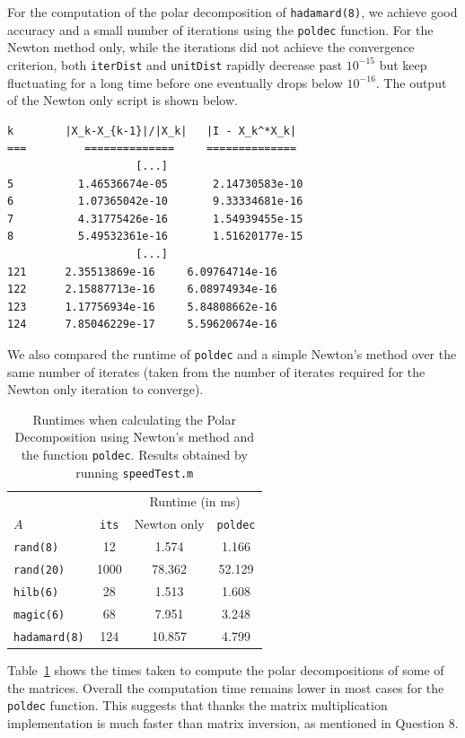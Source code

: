 \documentclass[10pt, A4paper]{article}
\begin{document}
For the computation of the polar decomposition of \texttt{hadamard(8)}, 
we achieve good accuracy and a small number of iterations using the 
\texttt{poldec} function. For the Newton method only, while the 
iterations did not achieve the convergence criterion, both 
\texttt{iterDist} and \texttt{unitDist} rapidly decrease past 
$10^{-15}$ but keep fluctuating for a long time before one eventually 
drops below $10^{-16}$. The output of the Newton only script is shown 
below.
\begin{verbatim}
k   	 |X_k-X_{k-1}|/|X_k|   |I - X_k^*X_k|
=== 	    ==============     ==============
                    [...]
5	       1.46536674e-05	    2.14730583e-10
6	       1.07365042e-10	    9.33334681e-16
7	       4.31775426e-16	    1.54939455e-15
8	       5.49532361e-16	    1.51620177e-15
                    [...]
121	     2.35513869e-16	    6.09764714e-16
122	     2.15887713e-16	    6.08974934e-16
123      1.17756934e-16	    5.84808662e-16
124      7.85046229e-17	    5.59620674e-16
\end{verbatim}

We also compared the runtime of \texttt{poldec} and a simple Newton's 
method over the same number of iterates (taken from the number of 
iterates required for the Newton only iteration to converge).
\begin{table}[t]
	\centering
	\begin{tabular}{ l c c c }
		\toprule
		& &\multicolumn{2}{c}{Runtime (in ms)} \\
		\cmidrule(lr){3-4}
		$A$ & \texttt{its} & Newton only & \texttt{poldec} \\
		\midrule
		\texttt{rand(8)}     & 12   & 1.574  & 1.166  \\
		\texttt{rand(20)}    & 1000 & 78.362 & 52.129 \\
		\texttt{hilb(6)}     & 28   & 1.513  & 1.608  \\
		\texttt{magic(6)}    & 68   & 7.951  & 3.248  \\
		\texttt{hadamard(8)} & 124  & 10.857 & 4.799  \\
		\bottomrule
	\end{tabular}
	\caption{
	Runtimes when calculating the Polar Decomposition using 
	Newton's method and the function \texttt{poldec}. Results obtained 
	by running \texttt{speedTest.m}
	\label{tab:runtimes}}
\end{table}
Table~\ref{tab:runtimes} shows the times taken to compute the polar 
decompositions of some of the matrices. Overall the computation time 
remains lower in most cases for the \texttt{poldec} function.
This suggests that thanks the matrix multiplication implementation is 
much faster than matrix inversion, as mentioned in Question 8.
\end{document}
